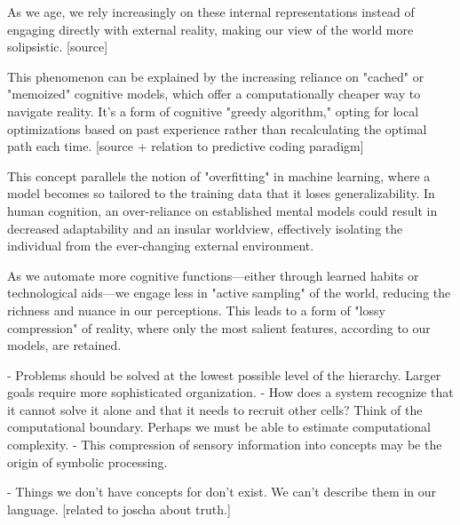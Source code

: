 As we age, we rely increasingly on these internal representations instead of engaging directly with external reality, making our view of the world more solipsistic. [source]


This phenomenon can be explained by the increasing reliance on "cached" or "memoized" cognitive models, which offer a computationally cheaper way to navigate reality. It's a form of cognitive "greedy algorithm," opting for local optimizations based on past experience rather than recalculating the optimal path each time. [source + relation to predictive coding paradigm]

This concept parallels the notion of "overfitting" in machine learning, where a model becomes so tailored to the training data that it loses generalizability. In human cognition, an over-reliance on established mental models could result in decreased adaptability and an insular worldview, effectively isolating the individual from the ever-changing external environment.

As we automate more cognitive functions—either through learned habits or technological aids—we engage less in "active sampling" of the world, reducing the richness and nuance in our perceptions. This leads to a form of "lossy compression" of reality, where only the most salient features, according to our models, are retained.


- Problems should be solved at the lowest possible level of the hierarchy. Larger goals require more sophisticated organization.
- How does a system recognize that it cannot solve it alone and that it needs to recruit other cells? Think of the computational boundary. Perhaps we must be able to estimate computational complexity. 
- This compression of sensory information into concepts may be the origin of symbolic processing. 

- Things we don't have concepts for don't exist. We can't describe them in our language. [related to joscha about truth.] 





